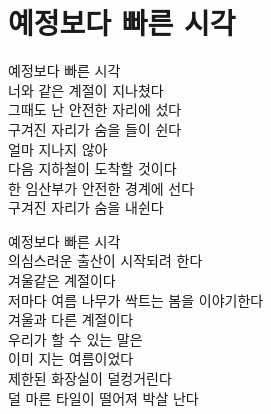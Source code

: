\begin{article}
\hypertarget{uxc608uxc815uxbcf4uxb2e4-uxbe60uxb978-uxc2dcuxac01}{%
\chapter{예정보다 빠른 시각}\label{uxc608uxc815uxbcf4uxb2e4-uxbe60uxb978-uxc2dcuxac01}}

예정보다 빠른 시각\\
너와 같은 계절이 지나쳤다\\
그때도 난 안전한 자리에 섰다\\
구겨진 자리가 숨을 들이 쉰다\\
얼마 지나지 않아\\
다음 지하철이 도착할 것이다\\
한 임산부가 안전한 경계에 선다\\
구겨진 자리가 숨을 내쉰다

예정보다 빠른 시각\\
의심스러운 출산이 시작되려 한다\\
겨울같은 계절이다\\
저마다 여름 나무가 싹트는 봄을 이야기한다\\
겨울과 다른 계절이다\\
우리가 할 수 있는 말은\\
이미 지는 여름이었다\\
제한된 화장실이 덜컹거린다\\
덜 마른 타일이 떨어져 박살 난다
\end{article}


